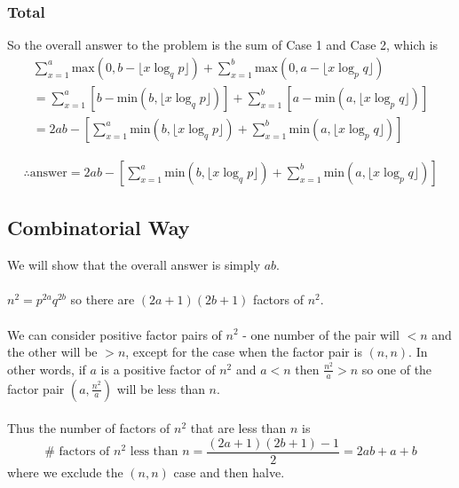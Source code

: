 \documentclass{article}
\begin{document}
\subsubsection{Total}
So the overall answer to the problem is the sum of Case 1 and Case 2, which is
\begin{equation*}
\begin{split}
    \sum_{x=1}^a \text{max}(0, b - \lfloor x \log_q p\rfloor) + \sum_{x=1}^b \text{max}(0, a - \lfloor x \log_p q\rfloor)\\
    = \sum_{x=1}^a \left[ b - \text{min}(b, \lfloor x \log_q p\rfloor) \right] + \sum_{x=1}^b \left[ a - \text{min}(a, \lfloor x \log_p q\rfloor) \right] \\
    = 2ab - \left[ \sum_{x=1}^a \text{min}(b, \lfloor x \log_q p\rfloor) + \sum_{x=1}^b \text{min}(a, \lfloor x \log_p q\rfloor) \right]
\end{split}
\end{equation*}
\begin{tcolorbox}
\begin{equation}
\begin{split}
    \therefore \text{answer} = 2ab - \left[ \sum_{x=1}^a \text{min}(b, \lfloor x \log_q p\rfloor) + \sum_{x=1}^b \text{min}(a, \lfloor x \log_p q\rfloor) \right]
\end{split}
\end{equation}
\end{tcolorbox}





\subsection{Combinatorial Way}

We will show that the overall answer is simply $ab$.\\\\
$n^2 = p^{2a}q^{2b}$ so there are $(2a+1)(2b+1)$ factors of $n^2$.\\\\
We can consider positive factor pairs of $n^2$ - one number of the pair will $<n$ and the other will be $>n$, except for the case when the factor pair is $(n, n)$. In other words, if $a$ is a positive factor of $n^2$ and $a<n$ then $\frac{n^2}{a} > n$ so one of the factor pair $(a, \frac{n^2}{a})$ will be less than $n$.\\\\
Thus the number of factors of $n^2$ that are less than $n$ is
\[ \# \text{ factors of }n^2 \text{ less than }n = \frac{(2a+1)(2b+1) - 1}{2} = 2ab + a + b\]
where we exclude the $(n, n)$ case and then halve.\\\\
\end{document}
